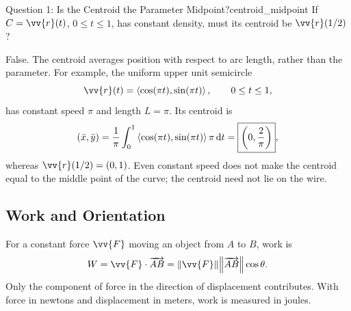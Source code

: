 \begin{center}
\end{center}

\newpage
\begin{problem}{Question 1: Is the Centroid the Parameter Midpoint?}{centroid_midpoint}
If $C = \vv{r}(t)$, $0 \le t \le 1$, has constant density, must its centroid be $\vv{r}(1/2)$?
\end{problem}
\begin{sol}
False.
The centroid averages position with respect to arc length, rather than the parameter. For example, the uniform upper unit semicircle
\[
    \vv{r}(t) = \ang{\cos(\pi t),\sin(\pi t)},\qquad 0 \le t \le 1,
\]
has constant speed $\pi$ and length $L = \pi$. Its centroid is
\[
    (\bar{x},\bar{y})
    = \frac{1}{\pi}\int_0^1\left\langle \cos(\pi t),\sin(\pi t) \right\rangle\pi\,\mathrm{d}t
    = \boxed{\left(0,\frac{2}{\pi}\right)},
\]
whereas $\vv{r}(1/2) = (0,1)$. Even constant speed does not make the centroid equal to the middle point of the curve; the centroid need not lie on the wire.
\end{sol}




\newpage
\subsection{Work and Orientation}
For a constant force $\vv{F}$ moving an object from $A$ to $B$, work is
\[
    W = \vv{F}\cdot\overrightarrow{AB}
    = \norm{\vv{F}}\norm{\overrightarrow{AB}}\cos\theta.
\]
Only the component of force in the direction of displacement contributes. With force in newtons and displacement in meters, work is measured in joules.


